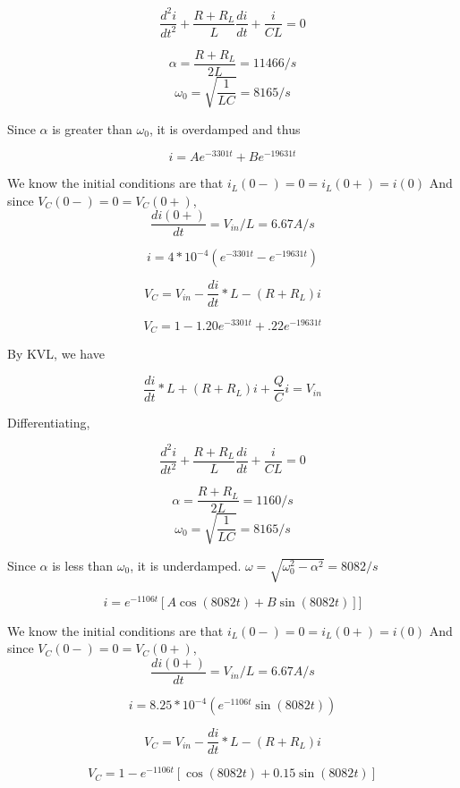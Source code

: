 \documentclass{article}
\begin{document}
$$\frac{d^2i}{dt^2} + \frac{R+R_L}{L}\frac{di}{dt} + \frac{i}{CL} = 0$$

$$\alpha =  \frac{R+R_L}{2L} = 11466/s$$
$$\omega_0 = \sqrt{\frac{1}{LC}} = 8165/s$$ 

Since $\alpha$ is greater than $\omega_0$, it is overdamped and thus

$$i = Ae^{-3301t}+Be^{-19631t}$$

We know the initial conditions are that $i_L(0-) = 0 = i_L(0+) = i(0)$
And since
$V_C(0-) = 0 = V_C(0+)$, 
$$\frac{di(0+)}{dt} = V_{in}/L = 6.67A/s$$

$$i = 4*10^{-4} (e^{-3301t}-e^{-19631t} )$$

$$V_C = V_{in}- \frac{di}{dt}*L - (R+R_L)i$$

$$V_C = 1 - 1.20e^{-3301t}+.22e^{-19631t}$$



\vspace{10cm}


By KVL, we have

$$\frac{di}{dt}*L + (R+R_L)i + \frac{Q}{C} i = V_{in}$$

Differentiating, 

$$\frac{d^2i}{dt^2} + \frac{R+R_L}{L}\frac{di}{dt} + \frac{i}{CL} = 0$$

$$\alpha =  \frac{R+R_L}{2L} = 1160/s$$
$$\omega_0 = \sqrt{\frac{1}{LC}} = 8165/s$$ 

Since $\alpha$ is less than $\omega_0$, it is underdamped. 
$\omega = \sqrt{\omega_0^2 -\alpha^2} = 8082/s$ 

$$i = e^{-1106t}[A\cos(8082t)+B\sin(8082t)]]$$

We know the initial conditions are that $i_L(0-) = 0 = i_L(0+) = i(0)$
And since
$V_C(0-) = 0 = V_C(0+)$, 
$$\frac{di(0+)}{dt} = V_{in}/L = 6.67A/s$$

$$i = 8.25*10^{-4} (e^{-1106t} \sin(8082t) )$$

$$V_C = V_{in}- \frac{di}{dt}*L - (R+R_L)i$$

$$V_C = 1  - e^{-1106t}[\cos(8082t)+0.15\sin(8082t)]$$
\end{document}
